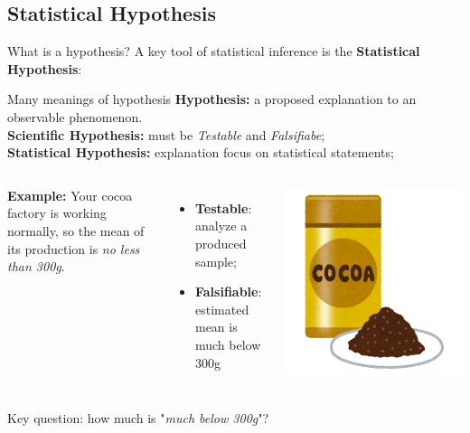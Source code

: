 \subsection{Statistical Hypothesis}
\begin{frame}{What is a hypothesis?}
  A key tool of statistical inference is the {\bf Statistical Hypothesis}:
  \begin{block}{Many meanings of hypothesis}
    {\bf Hypothesis:} a proposed explanation to an observable phenomenon.\\
    {\bf Scientific Hypothesis:} must be \emph{Testable} and \emph{Falsifiabe};\\
    {\bf Statistical Hypothesis:} explanation focus on statistical statements;\\

  \end{block}\bigskip

  \begin{columns}
    {\bf Example:} Your cocoa factory is working normally, so the mean of its production is \emph{no less than 300g}.
    \begin{itemize}
      \item {\bf Testable}: analyze a produced sample;
      \item {\bf Falsifiable}: estimated mean is \alert{much below 300g}
    \end{itemize}
    \includegraphics[width=\textwidth]{../img/irasutoya_cocoa}
  \end{columns}
  \vfill

  Key question: how much is "\emph{much below 300g}"?
\end{frame}

